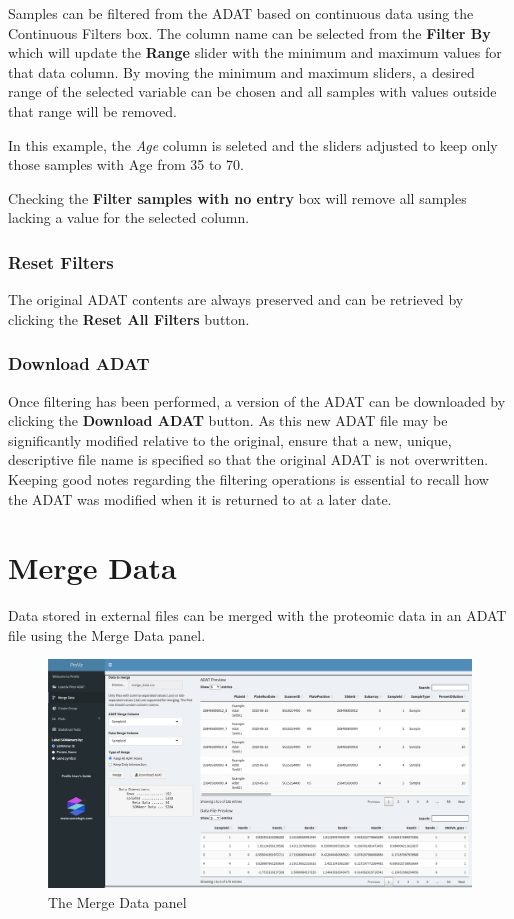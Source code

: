 \documentclass[
]{book}
\begin{document}
Samples can be filtered from the ADAT based on continuous data using the Continuous Filters box. The column name can be selected from the \textbf{Filter By} which will update the \textbf{Range} slider with the minimum and maximum values for that data column. By moving the minimum and maximum sliders, a desired range of the selected variable can be chosen and all samples with values outside that range will be removed.

In this example, the \emph{Age} column is seleted and the sliders adjusted to keep only those samples with Age from 35 to 70.

Checking the \textbf{Filter samples with no entry} box will remove all samples lacking a value for the selected column.

\hypertarget{reset-filters}{%
\subsection{Reset Filters}\label{reset-filters}}

The original ADAT contents are always preserved and can be retrieved by clicking the \textbf{Reset All Filters} button.

\hypertarget{download-adat}{%
\subsection{Download ADAT}\label{download-adat}}

Once filtering has been performed, a version of the ADAT can be downloaded by clicking the \textbf{Download ADAT} button. As this new ADAT file may be significantly modified relative to the original, ensure that a new, unique, descriptive file name is specified so that the original ADAT is not overwritten. Keeping good notes regarding the filtering operations is essential to recall how the ADAT was modified when it is returned to at a later date.

\hypertarget{merge-data}{%
\chapter{Merge Data}\label{merge-data}}

Data stored in external files can be merged with the proteomic data in an ADAT file using the Merge Data panel.

\begin{figure}
\centering
\includegraphics{images/MergeData.png}
\caption{The Merge Data panel}
\end{figure}
\end{document}
